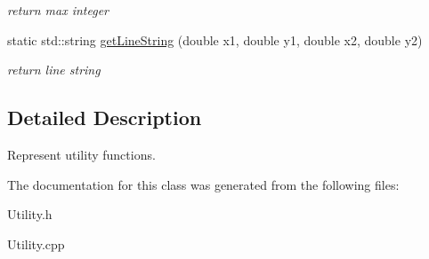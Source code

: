 \begin{DoxyCompactItemize}
\begin{DoxyCompactList}\small\item\em return max integer \end{DoxyCompactList}\item 
static std\+::string \hyperlink{class_pathing_lib_1_1_utility_aa5a681611061d85a74a486f01d621997}{get\+Line\+String} (double x1, double y1, double x2, double y2)\hypertarget{class_pathing_lib_1_1_utility_aa5a681611061d85a74a486f01d621997}{}\label{class_pathing_lib_1_1_utility_aa5a681611061d85a74a486f01d621997}

\begin{DoxyCompactList}\small\item\em return line string \end{DoxyCompactList}\end{DoxyCompactItemize}


\subsection{Detailed Description}
Represent utility functions. 

The documentation for this class was generated from the following files\+:\begin{DoxyCompactItemize}
\item 
Utility.\+h\item 
Utility.\+cpp\end{DoxyCompactItemize}
